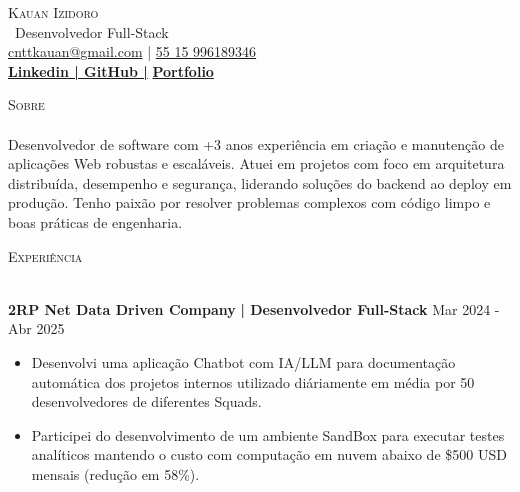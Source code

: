 \documentclass[a4paper]{article}
\newcommand{\lineunder}{
    \vspace*{-8pt} \\
    \hspace*{-18pt} \hrulefill \\
}
\newcommand{\header}[1]{
    {\hspace*{-18pt}\vspace*{6pt} \textsc{#1}}
    \vspace*{-6pt} \lineunder
}
\begin{document}
    \vspace*{-40pt}

    \vspace*{-2pt}
    \begin{center}
        {\Huge \scshape {Kauan Izidoro}}\\
        \vspace*{2pt}
        \ {Desenvolvedor Full-Stack}\\
        \vspace*{2pt}
        \href{mailto:cnttkauan@gmail.com}{cnttkauan@gmail.com} | \href{tel:+55 15 996189346}{55 15 996189346}\\
        \vspace*{4pt}
        \textbf{\href{https://www.linkedin.com/in/kauanizidoro/}{Linkedin | }}\textbf{\href{https://github.com/KauanIzidoro}{GitHub |}}
        \textbf{\href{https://evolvebrasil.com/}{Portfolio}}\\
    \end{center}

    \header{Sobre}
    \vspace{2mm}
    Desenvolvedor de software com +3 anos experiência em criação e manutenção de aplicações Web robustas e escaláveis. Atuei em projetos com foco em arquitetura distribuída, desempenho e segurança, liderando soluções do backend ao deploy em produção. Tenho paixão por resolver problemas complexos com código limpo e boas práticas de engenharia.
    \vspace{2mm}

    \header{Experiência}
    \vspace{2mm}

    \textbf{2RP Net Data Driven Company}\textbf{ | Desenvolvedor Full-Stack} \hfill  Mar 2024 - Abr 2025\\
    \vspace{-3mm}
    \begin{itemize} \itemsep -3pt
        \item Desenvolvi uma aplicação Chatbot com IA/LLM para documentação automática dos projetos internos utilizado diáriamente em média por 50 desenvolvedores de diferentes Squads.
        \item Participei do desenvolvimento de um ambiente SandBox para executar testes analíticos mantendo o custo com computação em nuvem abaixo de \$500 USD mensais (redução em 58\%).
    \end{itemize}
    
\end{document}
